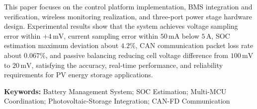 This paper focuses on the control platform implementation, BMS integration and verification, wireless monitoring realization, and three-port power stage hardware design. Experimental results show that the system achieves voltage sampling error within $+4\,\mathrm{mV}$, current sampling error within $50\,\mathrm{mA}$ below $5\,\mathrm{A}$, SOC estimation maximum deviation about $4.2\%$, CAN communication packet loss rate about $0.067\%$, and passive balancing reducing cell voltage difference from $100\,\mathrm{mV}$ to $20\,\mathrm{mV}$, satisfying the accuracy, real-time performance, and reliability requirements for PV energy storage applications.

\vspace{1em}
\noindent\textbf{Keywords:} Battery Management System; SOC Estimation; Multi-MCU Coordination; Photovoltaic-Storage Integration; CAN-FD Communication

